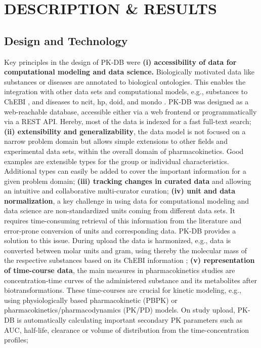 \documentclass[a4,center,fleqn]{NAR}
\begin{document}

\section{DESCRIPTION \& RESULTS}

\subsection{Design and Technology}

Key principles in the design of PK-DB were \textbf{(i) accessibility of data for computational modeling and data science.} Biologically motivated data like substances or diseases are annotated to biological ontologies. This enables the integration with other data sets and computational models, e.g., substances to ChEBI \cite{Hastings2016}, and diseases to ncit, hp, doid, and mondo \cite{Sioutos2007, Kohler2019, Kibbe2015, Mungall2017}. PK-DB was designed as a web-reachable database, accessible either via a web frontend or programmatically via a REST API. Hereby, most of the data is indexed for a fast full-text search; 
\textbf{(ii) extensibility and generalizability}, the data model is not focused on a narrow problem domain but allows simple extensions to other fields and experimental data sets, within the overall domain of pharmacokinetics. Good examples are extensible types for the group or individual characteristics. Additional types can easily be added to cover the important information for a given problem domain;
\textbf{(iii) tracking changes in curated data} and allowing an intuitive and collaborative multi-curator curation;
\textbf{(iv) unit and data normalization}, a key challenge in using data for computational modeling and data science are non-standardized units coming from different data sets. It requires time-consuming retrieval of this information from the literature and error-prone conversion of units and corresponding data. PK-DB provides a solution to this issue. During upload the data is harmonized, e.g., data is converted between molar units and gram, using thereby the molecular mass of the respective substances based on its ChEBI information  \cite{Hastings2016};
\textbf{(v) representation of time-course data}, the main measures in pharmacokinetics studies are concentration-time curves of the administered substance and its metabolites after biotransformations. These time-courses are crucial for kinetic modeling, e.g., using physiologically based pharmacokinetic (PBPK) or pharmacokinetics/pharmacodynamics (PK/PD) models. On study upload, PK-DB is automatically calculating important secondary PK parameters such as AUC, half-life, clearance or volume of distribution from the time-concentration profiles; 
\end{document}
